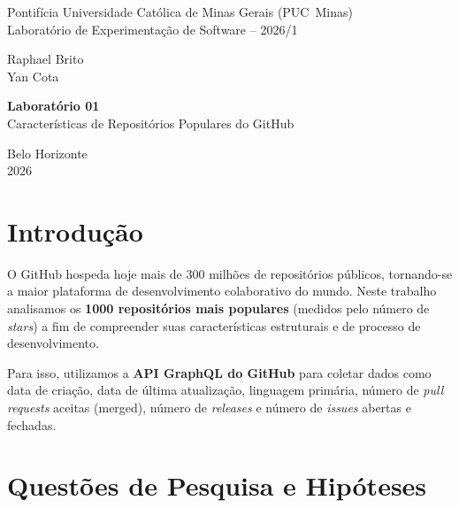 \documentclass[10pt,a4paper,twocolumn]{article}
\begin{document}
\onecolumn

\begin{titlepage}
  \centering
  \vspace*{2.0cm}

  {\normalsize
    Pontifícia Universidade Católica de Minas Gerais (PUC~Minas)\\
    Laboratório de Experimentação de Software -- 2026/1
  }

  \vspace*{2.8cm}

  {\large
    Raphael Brito\\[0.3em]
    Yan Cota
  }

  \vspace*{4.2cm}

  {\LARGE \textbf{Laboratório 01}\\[0.5em]
  \Large Características de Repositórios Populares do GitHub}

  \vfill

  {\normalsize Belo Horizonte\\ 2026}
\end{titlepage}

\tableofcontents
\newpage
{}
\setcounter{page}{1}
\twocolumn

\section{Introdução}

O GitHub hospeda hoje mais de 300 milhões de repositórios públicos, tornando-se
a maior plataforma de desenvolvimento colaborativo do mundo. Neste trabalho
analisamos os \textbf{1000 repositórios mais populares} (medidos pelo número
de \textit{stars}) a fim de compreender suas características estruturais e de
processo de desenvolvimento.

Para isso, utilizamos a \textbf{API GraphQL do GitHub} para coletar dados como
data de criação, data de última atualização, linguagem primária, número de
\textit{pull requests} aceitas (merged), número de \textit{releases} e número de
\textit{issues} abertas e fechadas.

\section{Questões de Pesquisa e Hipóteses}
\end{document}

